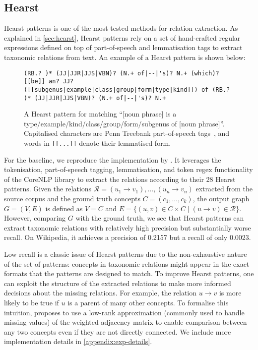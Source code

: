 \subsection{Hearst}
Hearst patterns \cite{hearst1998automated} is one of the most tested methods for relation extraction. As explained in \cref{sec:hearst}, Hearst patterns rely on a set of hand-crafted regular expressions defined on top of part-of-speech and lemmatisation tags to extract taxonomic relations from text. An example of a Hearst pattern is shown below:

\begin{figure}[h]
    \begin{lstlisting}[frame=single]
(RB.? )* (JJ|JJR|JJS|VBN)? (N.+ of|--|'s)? N.+ (which)? [[be]] an? JJ? ([[subgenus|example|class|group|form|type|kind]]) of (RB.? )* (JJ|JJR|JJS|VBN)? (N.+ of|--|'s)? N.+
\end{lstlisting}
    \caption{A Hearst pattern for matching ``[noun phrase] is a type/example/kind/class/group/form/subgenus of [noun phrase]''. Capitalised characters are Penn Treebank part-of-speech tags~\cite{marcus1993building}, and words in \texttt{[[...]]} denote their lemmatised form.}
\end{figure}

For the baseline, we reproduce the implementation by \citet{roller2018hearst}. It leverages the tokenisation, part-of-speech tagging, lemmatisation, and token regex functionality of the CoreNLP library \cite{manning2014stanford} to extract the relations according to their 28 Hearst patterns. Given the relations $\mathcal{R} = (u_1 \to v_1), \dots, (u_n \to v_n)$ extracted from the source corpus and the ground truth concepts $C = (c_1, \dots, c_k)$, the output graph $G = (V, E)$ is defined as $V = C$ and $E = \{(u, v) \in C \times C \mid (u \to v) \in \mathcal{R}\}$. However, comparing $G$ with the ground truth, we see that Hearst patterns can extract taxonomic relations with relatively high precision but substantially worse recall. On Wikipedia, it achieves a precision of 0.2157 but a recall of only 0.0023.

Low recall is a classic issue of Hearst patterns due to the non-exhaustive nature of the set of patterns: concepts in taxonomic relations might appear in the exact formats that the patterns are designed to match. To improve Hearst patterns, one can exploit the structure of the extracted relations to make more informed decisions about the missing relations. For example, the relation $u \to v$ is more likely to be true if $u$ is a parent of many other concepts. To formalise this intuition, \citet{roller2018hearst} proposes to use a low-rank approximation \cite{schmidt1907theorie} (commonly used to handle missing values) of the weighted adjacency matrix to enable comparison between any two concepts even if they are not directly connected. We include more implementation details in \cref{appendix:exp-details}.

